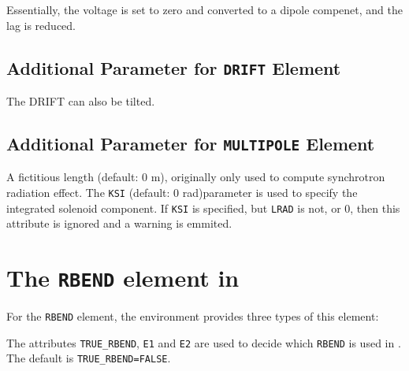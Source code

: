 Essentially, the voltage is set to zero and converted to a dipole compenet, and 
the lag is reduced. 

\subsection{Additional Parameter for \texttt{DRIFT} Element}
\begin{madlist}
   The DRIFT can also be tilted. 
\end{madlist}

\subsection{Additional Parameter for \texttt{MULTIPOLE} Element}

\begin{madlist}
   A fictitious length (default: 0 m), originally only used to 
  compute synchrotron radiation effect.
   The \texttt{KSI} (default: 0 rad)parameter is used to specify the 
  integrated solenoid component. If \texttt{KSI} is specified, but \texttt{LRAD}
  is not, or 0, then this attribute is ignored and a warning is emmited.
\end{madlist}

\section{The \texttt{RBEND} element in \ptc}

For the \texttt{RBEND} element, the \ptc environment provides
three types of this element:

The attributes \texttt{TRUE\_RBEND}, \texttt{E1} and \texttt{E2} are used to 
decide which \texttt{RBEND} is used in \ptc. 
The default is \texttt{TRUE\_RBEND=FALSE}.

